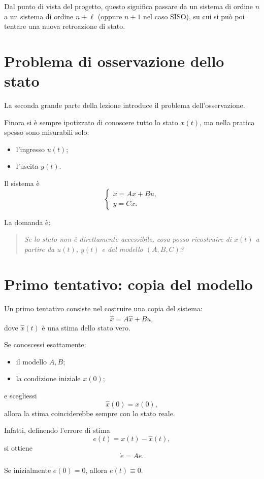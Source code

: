 Dal punto di vista del progetto, questo significa passare da un sistema di ordine \(n\)
a un sistema di ordine \(n+\ell\) (oppure \(n+1\) nel caso SISO),
su cui si può poi tentare una nuova retroazione di stato.

\section{Problema di osservazione dello stato}

La seconda grande parte della lezione introduce il problema dell'osservazione.

Finora si è sempre ipotizzato di conoscere tutto lo stato \(x(t)\),
ma nella pratica spesso sono misurabili solo:
\begin{itemize}
    \item l'ingresso \(u(t)\);
    \item l'uscita \(y(t)\).
\end{itemize}

Il sistema è
\[
\begin{cases}
\dot x=Ax+Bu,\\
y=Cx.
\end{cases}
\]

La domanda è:

\begin{quote}
\emph{Se lo stato non è direttamente accessibile, cosa posso ricostruire di \(x(t)\)
a partire da \(u(t)\), \(y(t)\) e dal modello \((A,B,C)\)?}
\end{quote}

\section{Primo tentativo: copia del modello}

Un primo tentativo consiste nel costruire una copia del sistema:
\[
\dot{\hat x}=A\hat x+Bu,
\]
dove \(\hat x(t)\) è una stima dello stato vero.

Se conoscessi esattamente:
\begin{itemize}
    \item il modello \(A,B\);
    \item la condizione iniziale \(x(0)\);
\end{itemize}
e scegliessi
\[
\hat x(0)=x(0),
\]
allora la stima coinciderebbe sempre con lo stato reale.

Infatti, definendo l'errore di stima
\[
e(t)=x(t)-\hat x(t),
\]
si ottiene
\[
\dot e=Ae.
\]

Se inizialmente \(e(0)=0\), allora \(e(t)\equiv 0\).

